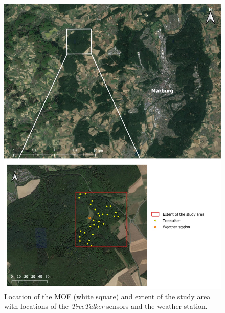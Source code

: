 \documentclass[5p]{elsarticle} %
\begin{document}
\graphicspath{ {./figures/} }

\begin{figure}[t]
\begin{center}
\includegraphics[scale=0.8]{study_area}
\caption{Location of the MOF (white square) and extent of the study area with locations of the \emph{TreeTalker} sensors and the weather station.}
\end{center}
\end{figure}
\end{document}
